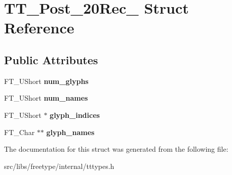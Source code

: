 \hypertarget{struct_t_t___post__20_rec__}{
\section{TT\_\-Post\_\-20Rec\_\- Struct Reference}
\label{struct_t_t___post__20_rec__}
}
\subsection*{Public Attributes}
\begin{DoxyCompactItemize}
\item 
\hypertarget{struct_t_t___post__20_rec___ae3de3677810e6581f2c197e8fa902979}{
FT\_\-UShort {\bfseries num\_\-glyphs}}
\label{struct_t_t___post__20_rec___ae3de3677810e6581f2c197e8fa902979}

\item 
\hypertarget{struct_t_t___post__20_rec___af726ff4997521c76de36f76e1203e2b1}{
FT\_\-UShort {\bfseries num\_\-names}}
\label{struct_t_t___post__20_rec___af726ff4997521c76de36f76e1203e2b1}

\item 
\hypertarget{struct_t_t___post__20_rec___a7f0a07ab96ccbe2597378f7aa2de3f8c}{
FT\_\-UShort $\ast$ {\bfseries glyph\_\-indices}}
\label{struct_t_t___post__20_rec___a7f0a07ab96ccbe2597378f7aa2de3f8c}

\item 
\hypertarget{struct_t_t___post__20_rec___a8330fbc7db3659ac621e98d7ceb8aad3}{
FT\_\-Char $\ast$$\ast$ {\bfseries glyph\_\-names}}
\label{struct_t_t___post__20_rec___a8330fbc7db3659ac621e98d7ceb8aad3}

\end{DoxyCompactItemize}


The documentation for this struct was generated from the following file:\begin{DoxyCompactItemize}
\item 
src/libs/freetype/internal/tttypes.h\end{DoxyCompactItemize}

